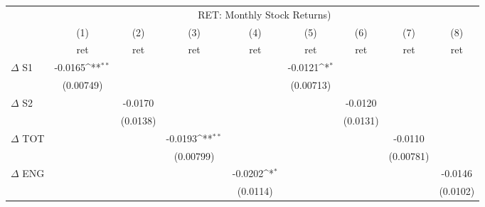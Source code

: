 {
\def\sym#1{\ifmmode^{#1}\else\(^{#1}\)\fi}
\begin{tabular}{l*{8}{c}}
\hline\hline
                    &\multicolumn{8}{c}{RET: Monthly Stock Returns) }                                                                                                                               \\\cmidrule(lr){2-9}
                    &\multicolumn{1}{c}{(1)}&\multicolumn{1}{c}{(2)}&\multicolumn{1}{c}{(3)}&\multicolumn{1}{c}{(4)}&\multicolumn{1}{c}{(5)}&\multicolumn{1}{c}{(6)}&\multicolumn{1}{c}{(7)}&\multicolumn{1}{c}{(8)}\\
                    &\multicolumn{1}{c}{ret}&\multicolumn{1}{c}{ret}&\multicolumn{1}{c}{ret}&\multicolumn{1}{c}{ret}&\multicolumn{1}{c}{ret}&\multicolumn{1}{c}{ret}&\multicolumn{1}{c}{ret}&\multicolumn{1}{c}{ret}\\
\hline
$\Delta$ S1         &     -0.0165\sym{**} &                     &                     &                     &     -0.0121\sym{*}  &                     &                     &                     \\
                    &   (0.00749)         &                     &                     &                     &   (0.00713)         &                     &                     &                     \\
$\Delta$ S2         &                     &     -0.0170         &                     &                     &                     &     -0.0120         &                     &                     \\
                    &                     &    (0.0138)         &                     &                     &                     &    (0.0131)         &                     &                     \\
$\Delta$ TOT        &                     &                     &     -0.0193\sym{**} &                     &                     &                     &     -0.0110         &                     \\
                    &                     &                     &   (0.00799)         &                     &                     &                     &   (0.00781)         &                     \\
$\Delta$ ENG        &                     &                     &                     &     -0.0202\sym{*}  &                     &                     &                     &     -0.0146         \\
                    &                     &                     &                     &    (0.0114)         &                     &                     &                     &    (0.0102)         \\

\end{tabular}}
